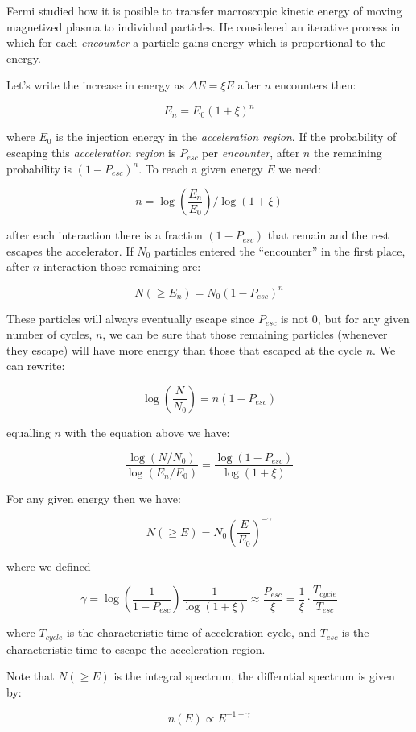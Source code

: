 \documentclass[
  letterpaper,
  DIV=11,
  numbers=noendperiod]{scrreprt}
\begin{document}
Fermi studied how it is posible to transfer macroscopic kinetic energy
of moving magnetized plasma to individual particles. He considered an
iterative process in which for each \emph{encounter} a particle gains
energy which is proportional to the energy.

Let's write the increase in energy as \(\Delta E = \xi E\) after \(n\)
encounters then:

\[E_n = E_0(1 + \xi)^n\]

where \(E_0\) is the injection energy in the \emph{acceleration region}.
If the probability of escaping this \emph{acceleration region} is
\(P_{esc}\) per \emph{encounter}, after \(n\) the remaining probability
is \((1 - P_{esc})^n\). To reach a given energy \(E\) we need:

\[n = \log\left(\frac{E_n}{E_0}\right)/\log(1 + \xi)\]

after each interaction there is a fraction \((1-P_{esc})\) that remain
and the rest escapes the accelerator. If \(N_0\) particles entered the
``encounter'' in the first place, after \(n\) interaction those
remaining are:

\[N(\ge  E_n) = N_0(1- P_{esc})^n \]

These particles will always eventually escape since \(P_{esc}\) is not
0, but for any given number of cycles, \(n\), we can be sure that those
remaining particles (whenever they escape) will have more energy than
those that escaped at the cycle \(n\). We can rewrite:

\[\log\left(\frac{N}{N_0}\right) = n(1 - P_{esc}) \]

equalling \(n\) with the equation above we have:

\[\frac{\log (N/N_0)}{\log (E_n/E_0)} = \frac{\log(1-P_{esc})}{\log(1+ \xi)}\]

For any given energy then we have:

\[N(\ge E) = N_0 \left(\frac{E}{E_0}\right)^{-\gamma}\]

where we defined

\[\gamma = \log\left(\frac{1}{1-P_{esc}}\right)\frac{1}{\log (1+\xi)} \approx \frac{P_{esc}}{\xi} = \frac{1}{\xi}\cdot\frac{T_{cycle}}{T_{esc}}\]

where \(T_{cycle}\) is the characteristic time of acceleration cycle,
and \(T_{esc}\) is the characteristic time to escape the acceleration
region.

Note that \(N(\ge E)\) is the integral spectrum, the differntial
spectrum is given by:

\[ n(E) \propto E^{-1 - \gamma} \]
\end{document}
